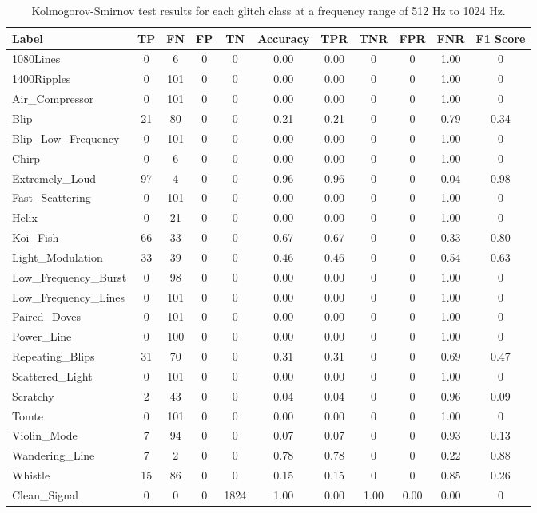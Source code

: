 \documentclass[12pt]{article}
\begin{document}
\begin{table}[H]
  \begin{tabular}{lcccccccccc}
  \toprule
  Label & TP & FN & FP & TN & Accuracy & TPR & TNR & FPR & FNR & F1 Score \\
  \midrule
  1080Lines & 0 & 6 & 0 & 0 & 0.00 & 0.00 & 0 & 0 & 1.00 & 0 \\
  1400Ripples & 0 & 101 & 0 & 0 & 0.00 & 0.00 & 0 & 0 & 1.00 & 0 \\
  Air\_Compressor & 0 & 101 & 0 & 0 & 0.00 & 0.00 & 0 & 0 & 1.00 & 0 \\
  Blip & 21 & 80 & 0 & 0 & 0.21 & 0.21 & 0 & 0 & 0.79 & 0.34 \\
  Blip\_Low\_Frequency & 0 & 101 & 0 & 0 & 0.00 & 0.00 & 0 & 0 & 1.00 & 0 \\
  Chirp & 0 & 6 & 0 & 0 & 0.00 & 0.00 & 0 & 0 & 1.00 & 0 \\
  Extremely\_Loud & 97 & 4 & 0 & 0 & 0.96 & 0.96 & 0 & 0 & 0.04 & 0.98 \\
  Fast\_Scattering & 0 & 101 & 0 & 0 & 0.00 & 0.00 & 0 & 0 & 1.00 & 0 \\
  Helix & 0 & 21 & 0 & 0 & 0.00 & 0.00 & 0 & 0 & 1.00 & 0 \\
  Koi\_Fish & 66 & 33 & 0 & 0 & 0.67 & 0.67 & 0 & 0 & 0.33 & 0.80 \\
  Light\_Modulation & 33 & 39 & 0 & 0 & 0.46 & 0.46 & 0 & 0 & 0.54 & 0.63 \\
  Low\_Frequency\_Burst & 0 & 98 & 0 & 0 & 0.00 & 0.00 & 0 & 0 & 1.00 & 0 \\
  Low\_Frequency\_Lines & 0 & 101 & 0 & 0 & 0.00 & 0.00 & 0 & 0 & 1.00 & 0 \\
  Paired\_Doves & 0 & 101 & 0 & 0 & 0.00 & 0.00 & 0 & 0 & 1.00 & 0 \\
  Power\_Line & 0 & 100 & 0 & 0 & 0.00 & 0.00 & 0 & 0 & 1.00 & 0 \\
  Repeating\_Blips & 31 & 70 & 0 & 0 & 0.31 & 0.31 & 0 & 0 & 0.69 & 0.47 \\
  Scattered\_Light & 0 & 101 & 0 & 0 & 0.00 & 0.00 & 0 & 0 & 1.00 & 0 \\
  Scratchy & 2 & 43 & 0 & 0 & 0.04 & 0.04 & 0 & 0 & 0.96 & 0.09 \\
  Tomte & 0 & 101 & 0 & 0 & 0.00 & 0.00 & 0 & 0 & 1.00 & 0 \\
  Violin\_Mode & 7 & 94 & 0 & 0 & 0.07 & 0.07 & 0 & 0 & 0.93 & 0.13 \\
  Wandering\_Line & 7 & 2 & 0 & 0 & 0.78 & 0.78 & 0 & 0 & 0.22 & 0.88 \\
  Whistle & 15 & 86 & 0 & 0 & 0.15 & 0.15 & 0 & 0 & 0.85 & 0.26 \\
  Clean\_Signal & 0 & 0 & 0 & 1824 & 1.00 & 0.00 & 1.00 & 0.00 & 0.00 & 0 \\
  \bottomrule
  \end{tabular}
  \caption{Kolmogorov-Smirnov test results for each glitch class at a frequency range of 512 Hz to 1024 Hz.}
  \label{tab:ks_high_frequency_results}
\end{table}
\end{document}
